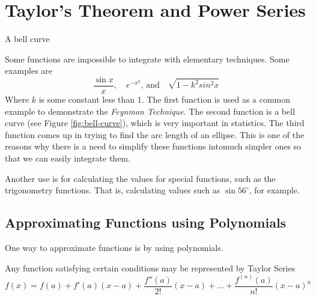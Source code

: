 \documentclass[working]{tuftebook}
\begin{document}
\chapter{Taylor's Theorem and Power Series}
\vspace{-2em}
\begin{marginfigure}
    \centering
    \caption{A bell curve}
    \label{fig:bell-curve}
\end{marginfigure}

Some functions are impossible to integrate with elementary techniques. Some examples are
\[
    \frac{ \sin x}{x},\quad e^{-x^2},\,\text{and}\quad \sqrt{1-k^2sin^2x}
\]
Where $k$ is some constant less than 1. The first function is used as a common example to demonstrate the \emph{Feynman Technique}. The second function is a bell curve (see Figure \ref{fig:bell-curve}), which is very important in statistics. The third function comes up in trying to find the arc length of an ellipse. This is one of the reasons why there is a need to simplify these functions intomuch simpler ones so that we can easily integrate them. 

Another use is for calculating the values for special functions, such as the trigonometry functions. That is, calculating values such as $ \sin56 ^{\circ}$, for example.

\section{Approximating Functions using Polynomials}
One way to approximate functions is by using polynomials. 
\begin{theorem}
    Any function satisfying certain conditions may be represented by Taylor Series
    \[
        f(x)=f(a)+f'(a)(x-a)+ \frac{f''(a)}{2!}(x-a)+...+ \frac{f^{(n)}(a)}{n!}(x-a)^n
    \]
\end{theorem}
\end{document}
